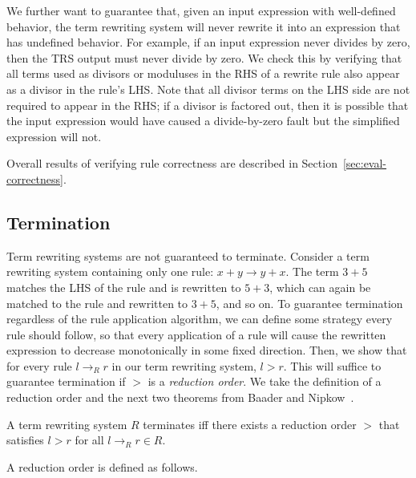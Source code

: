 \documentclass[sigplan,10pt,review,anonymous]{acmart}\settopmatter{printfolios=true,printccs=false,printacmref=false}
\begin{document}
We further want to guarantee that, given an input expression with well-defined
behavior, the term rewriting system will never rewrite it into an expression that has
undefined behavior. For example, if an input expression never divides by zero, then the
TRS output must never divide by zero. We check this by
verifying that all terms used as divisors or moduluses in the RHS of a
rewrite rule also appear as a divisor in the rule's LHS. Note that all divisor
terms on the LHS side are not required to appear in the RHS; if a divisor is
factored out, then it is possible that the input expression would have caused a
divide-by-zero fault but the simplified expression will not.

Overall results of verifying rule correctness are described in Section~\ref{sec:eval-correctness}.

\subsection{Termination}

Term rewriting systems are not guaranteed to terminate. Consider a term
rewriting system containing only one rule: $x + y \rightarrow y + x$. The term
$3 + 5$ matches the LHS of the rule and is rewritten to $5 + 3$, which can again
be matched to the rule and rewritten to $3 + 5$, and so on. To guarantee
termination regardless of the rule application algorithm, we can define some strategy
every rule should follow, so that every application of a rule will cause the rewritten expression to
decrease monotonically in some fixed direction. Then, we show that for every rule $l \rightarrow_R r$ in our
term rewriting system, $l > r$. This will suffice to guarantee termination if $>$ is a \emph{reduction
  order}. We take the definition of a reduction order and the next two theorems from Baader and Nipkow~\cite{baader1999term}.

\begin{theorem}\label{theorem:terminates}
A term rewriting system $R$ terminates iff there exists a reduction order $>$ that satisfies $l > r$ for all $l \rightarrow_R r \in R$.
\end{theorem}

A reduction order is defined as follows.
\end{document}
